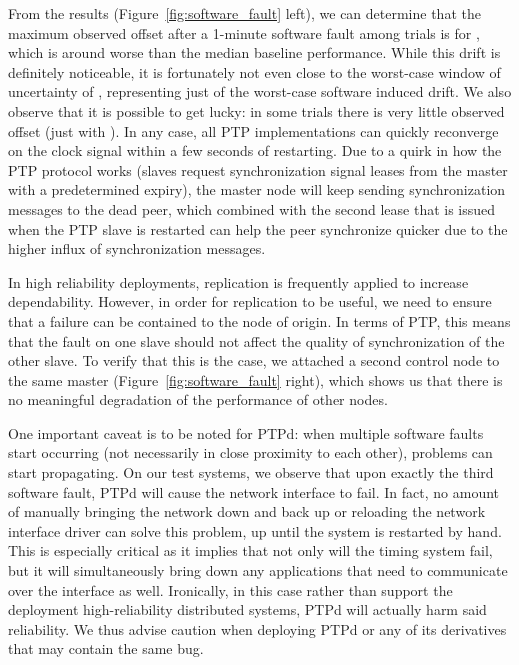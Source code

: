 
From the results (Figure~\ref{fig:software_fault} left), we can determine that the maximum observed offset after a 1-minute software fault among \fNum{\bSoftwareFaultNumProfiles} trials is \fTime{\cmpMax} for \fVendor{\cmpMaxArg}, which is around  worse than the median baseline performance. While this drift is definitely noticeable, it is fortunately not even close to the worst-case window of uncertainty of \fTimeMS{\windowOfUncertaintyOneMinute}, representing just \fPercentage[2]{\cmpMax/\windowOfUncertaintyOneMinute} of the worst-case software induced drift. We also observe that it is possible to get lucky: in some trials there is very little observed offset (just \fTime{\cmpMin} with \fVendor{\cmpMinArg}). In any case, all PTP implementations can quickly reconverge on the clock signal within a few seconds of restarting. Due to a quirk in how the PTP protocol works (slaves request synchronization signal leases from the master with a predetermined expiry), the master node will keep sending synchronization messages to the dead peer, which combined with the second lease that is issued when the PTP slave is restarted can help the peer synchronize quicker due to the higher influx of synchronization messages.

In high reliability deployments, replication is frequently applied to increase dependability. However, in order for replication to be useful, we need to ensure that a failure can be contained to the node of origin. In terms of PTP, this means that the fault on one slave should not affect the quality of synchronization of the other slave. To verify that this is the case, we attached a second control node to the same master (Figure~\ref{fig:software_fault} right), which shows us that there is no meaningful degradation of the performance of other nodes.

One important caveat is to be noted for PTPd: when multiple software faults start occurring (not necessarily in close proximity to each other), problems can start propagating. On our test systems, we observe that upon exactly the third software fault, PTPd will cause the network interface to fail. In fact, no amount of manually bringing the network down and back up or reloading the network interface driver can solve this problem, up until the system is restarted by hand. This is especially critical as it implies that not only will the timing system fail, but it will simultaneously bring down any applications that need to communicate over the interface as well. Ironically, in this case rather than support the deployment high-reliability distributed systems, PTPd will actually harm said reliability. We thus advise caution when deploying PTPd or any of its derivatives that may contain the same bug.

